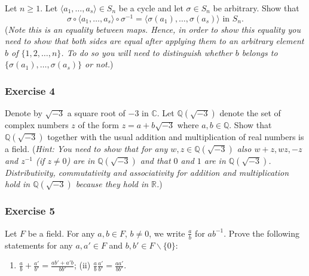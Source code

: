 \documentclass[
  12pt,
  a4paper,
  twoside]{article}
\providecommand{\tightlist}{%
  \setlength{\itemsep}{0pt}\setlength{\parskip}{0pt}}
\theoremstyle{plain}
\theoremstyle{definition}
\begin{document}
Let \(n \ge 1\). Let \(\langle a_1, \ldots, a_s \rangle \in S_n\)
be a cycle and let \(\sigma \in S_n\) be arbitrary. Show that
\[\sigma \circ \langle a_1, \ldots, a_s\rangle \circ \sigma^{-1} =
\langle \sigma(a_1), \ldots, \sigma(a_s)\rangle \textrm{ in }
S_n.\] (\emph{Note this is an equality between maps. Hence, in
order to show this equality you need to show that both sides
are equal after applying them to an arbitrary element \(b\) of
\(\{1, 2, \ldots, n\}\). To do so you will need to distinguish
whether \(b\) belongs to \(\{\sigma(a_1), \ldots, \sigma(a_s)\}\)
or not.})

\hypertarget{exercise-4-1}{%
\subsubsection*{Exercise 4}\label{exercise-4-1}}

Denote by \(\sqrt{-3}\) a square root of \(-3\) in \(\mathbb{C}\).
Let \(\mathbb{Q}(\sqrt{-3})\) denote the set of complex numbers \(z\) of the
form \(z= a + b \sqrt{-3}\) where \(a, b \in \mathbb{Q}\). Show that
\(\mathbb{Q}(\sqrt{-3})\) together with the usual addition and
multiplication of real numbers is a field. (\emph{Hint: You need
to show that for any \(w,z \in \mathbb{Q}(\sqrt{-3})\) also \(w+z, wz, -z\)
and \(z^{-1}\) (if \(z \not= 0\)) are in \(\mathbb{Q}(\sqrt{-3})\) and that
\(0\) and \(1\) are in \(\mathbb{Q}(\sqrt{-3})\). Distributivity,
commutativity and associativity for addition and multiplication
hold in \(\mathbb{Q}(\sqrt{-3})\) because they hold in \(\mathbb{R}\).})

\hypertarget{exercise-5}{%
\subsubsection*{Exercise 5}\label{exercise-5}}

Let \(F\) be a field. For any \(a, b \in F\), \(b \not= 0\), we write
\(\frac{a}{b}\) for \(ab^{-1}\). Prove the following statements for
any \(a, a' \in F\) and \(b,b' \in F\backslash \{0\}\):

\begin{enumerate}
\def\labelenumi{(\roman{enumi})}
\tightlist
\item
  \(\displaystyle{\frac{a}{b} + \frac{a'}{b'} = \frac{ab'+a'b}{bb'}}\);
  \hspace{1cm} (ii) \(\displaystyle{\frac{a}{b}\frac{a'}{b'} = \frac{aa'}{bb'}}\).
\end{enumerate}
\end{document}
